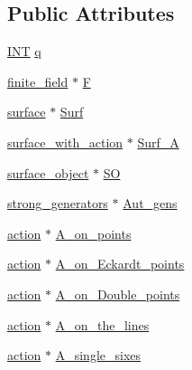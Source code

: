 \subsection*{Public Attributes}
\begin{DoxyCompactItemize}
\item 
\mbox{\hyperlink{galois_8h_a09fddde158a3a20bd2dcadb609de11dc}{I\+NT}} \mbox{\hyperlink{classsurface__object__with__action_a78d4c7381bbc6a751fa0b2875a7f0439}{q}}
\item 
\mbox{\hyperlink{classfinite__field}{finite\+\_\+field}} $\ast$ \mbox{\hyperlink{classsurface__object__with__action_ae29fa1f5a24fa0ed3babb4473d7eaf38}{F}}
\item 
\mbox{\hyperlink{classsurface}{surface}} $\ast$ \mbox{\hyperlink{classsurface__object__with__action_ae300d6b21d3058d39286aa95437a927e}{Surf}}
\item 
\mbox{\hyperlink{classsurface__with__action}{surface\+\_\+with\+\_\+action}} $\ast$ \mbox{\hyperlink{classsurface__object__with__action_af67a9dfb692ea4ec1b68f77c76ee68d8}{Surf\+\_\+A}}
\item 
\mbox{\hyperlink{classsurface__object}{surface\+\_\+object}} $\ast$ \mbox{\hyperlink{classsurface__object__with__action_a7ff25cc66e0b5f1b8da7b18b7dff7e3f}{SO}}
\item 
\mbox{\hyperlink{classstrong__generators}{strong\+\_\+generators}} $\ast$ \mbox{\hyperlink{classsurface__object__with__action_ae839ddd92faa0cb8a5edf27505b3e43e}{Aut\+\_\+gens}}
\item 
\mbox{\hyperlink{classaction}{action}} $\ast$ \mbox{\hyperlink{classsurface__object__with__action_aeb145aadb4d428d9a924bbfdcb515f8b}{A\+\_\+on\+\_\+points}}
\item 
\mbox{\hyperlink{classaction}{action}} $\ast$ \mbox{\hyperlink{classsurface__object__with__action_af79ea995a02609f110153a25e30fab68}{A\+\_\+on\+\_\+\+Eckardt\+\_\+points}}
\item 
\mbox{\hyperlink{classaction}{action}} $\ast$ \mbox{\hyperlink{classsurface__object__with__action_afbc8285699f90f035c5a914d21753c54}{A\+\_\+on\+\_\+\+Double\+\_\+points}}
\item 
\mbox{\hyperlink{classaction}{action}} $\ast$ \mbox{\hyperlink{classsurface__object__with__action_a5bb14643dfa97a456054b09f7f1b00d2}{A\+\_\+on\+\_\+the\+\_\+lines}}
\item 
\mbox{\hyperlink{classaction}{action}} $\ast$ \mbox{\hyperlink{classsurface__object__with__action_a4954b9e6941d65fddf060028c79cbbdc}{A\+\_\+single\+\_\+sixes}}
\item 

\end{DoxyCompactItemize}

